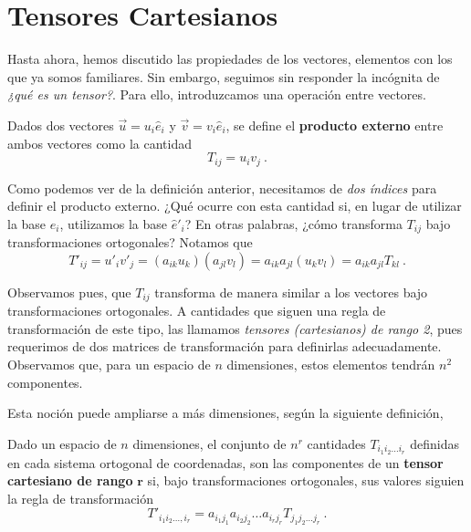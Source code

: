 \section{Tensores Cartesianos}

Hasta ahora, hemos discutido las propiedades de los vectores, elementos con los que ya somos familiares. Sin embargo, seguimos sin responder la incógnita de \emph{¿qué es un tensor?}. Para ello, introduzcamos una operación entre vectores.

\begin{defi}
    Dados dos vectores $\vec{u} = u_i \hat{e}_i$ y $\vec{v} = v_i \hat{e}_i$, se define el \textbf{producto externo} entre ambos vectores como la cantidad
    \begin{equation}
        T_{ij} = u_i v_j \ .
    \end{equation}
\end{defi}

Como podemos ver de la definición anterior, necesitamos de \emph{dos índices} para definir el producto externo. ¿Qué ocurre con esta cantidad si, en lugar de utilizar la base $\hat{e}_i$, utilizamos la base $\hat{e}'_i$? En otras palabras, ¿cómo transforma $T_{ij}$ bajo transformaciones ortogonales? Notamos que
\begin{equation}
    T'_{ij} = u'_i v'_j = (a_{ik}u_k)(a_{jl} v_l) = a_{ik} a_{jl} (u_k v_l) =  a_{ik} a_{jl} T_{kl} \ .
\end{equation}

Observamos pues, que $T_{ij}$ transforma de manera similar a los vectores bajo transformaciones ortogonales. A cantidades que siguen una regla de transformación de este tipo, las llamamos \emph{tensores (cartesianos) de rango 2}, pues requerimos de dos matrices de transformación para definirlas adecuadamente. Observamos que, para un espacio de $n$ dimensiones, estos elementos tendrán $n^2$ componentes.

Esta noción puede ampliarse a más dimensiones, según la siguiente definición,
\begin{defi} 
    Dado un espacio de $n$ dimensiones, el conjunto de $n^r$ cantidades $T_{i_1 i_2 \dots i_r}$ definidas en cada sistema ortogonal de coordenadas, son las componentes de un \textbf{tensor cartesiano de rango} $\mathbf{r}$ si, bajo transformaciones ortogonales, sus valores siguien la regla de transformación
    \begin{equation}
        T'_{i_1 i_2 \dots, i_r} = a_{i_1 j_1} a_{i_2 j_2} \dots a_{i_r j_r} T_{j_1 j_2 \dots j_r} \ . 
    \end{equation}
\end{defi}

